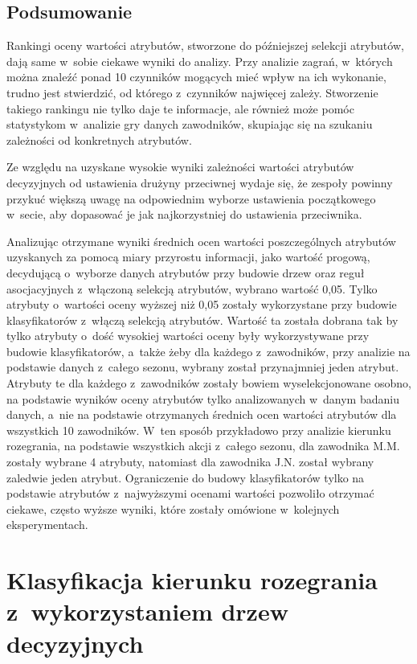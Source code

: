 \documentclass[a4paper,twoside,12pt]{book}
\begin{document}
\subsection{Podsumowanie}

Rankingi oceny wartości atrybutów, stworzone do późniejszej selekcji atrybutów, dają same w~sobie ciekawe wyniki do analizy. Przy analizie zagrań, w~których można znaleźć ponad 10 czynników mogących mieć wpływ na ich wykonanie, trudno jest stwierdzić, od którego z~czynników najwięcej zależy. Stworzenie takiego rankingu nie tylko daje te informacje, ale również może pomóc statystykom w~analizie gry danych zawodników, skupiając się na szukaniu zależności od konkretnych atrybutów.

Ze względu na uzyskane wysokie wyniki zależności wartości atrybutów decyzyjnych od ustawienia drużyny przeciwnej wydaje się, że zespoły powinny przykuć większą uwagę na odpowiednim wyborze ustawienia początkowego w~secie, aby dopasować je jak najkorzystniej do ustawienia przeciwnika.

Analizując otrzymane wyniki średnich ocen wartości poszczególnych atrybutów uzyskanych za pomocą miary przyrostu informacji, jako wartość progową, decydującą o~wyborze danych atrybutów przy budowie drzew oraz reguł asocjacyjnych z~włączoną selekcją atrybutów, wybrano wartość 0,05. Tylko atrybuty o~wartości oceny wyższej niż 0,05 zostały wykorzystane przy budowie klasyfikatorów z~włączą selekcją atrybutów. Wartość ta została dobrana tak by tylko atrybuty o~dość wysokiej wartości oceny były wykorzystywane przy budowie klasyfikatorów, a~także żeby dla każdego z~zawodników, przy analizie na podstawie danych z~całego sezonu, wybrany został przynajmniej jeden atrybut. Atrybuty te dla każdego z~zawodników zostały bowiem wyselekcjonowane osobno, na podstawie wyników oceny atrybutów tylko analizowanych w~danym badaniu danych, a~nie na podstawie otrzymanych średnich ocen wartości atrybutów dla wszystkich 10 zawodników. W~ten sposób przykładowo przy analizie kierunku rozegrania, na podstawie wszystkich akcji z~całego sezonu, dla zawodnika M.M. zostały wybrane 4 atrybuty, natomiast dla zawodnika J.N. został wybrany zaledwie jeden atrybut. Ograniczenie do budowy klasyfikatorów tylko na podstawie atrybutów z~najwyższymi ocenami wartości pozwoliło  otrzymać ciekawe, często wyższe wyniki, które zostały omówione w~kolejnych eksperymentach.


\section{Klasyfikacja kierunku rozegrania z~wykorzystaniem drzew decyzyjnych}
\label{roz:klasyfikacja-drzewa}
\end{document}
